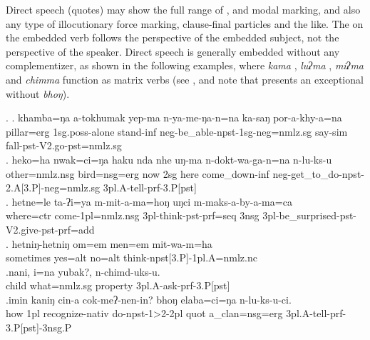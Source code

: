 Direct speech (quotes) may show the full range of ,  and modal marking, and also any type of illocutionary force marking, clause-final  particles and the like. The  on the embedded verb follows the perspective of the embedded subject, not the perspective of the speaker. Direct speech is generally embedded without any complementizer, as shown in the following examples, where \emph{kama} , \emph{luʔma} ,  \emph{miʔma}  and \emph{chimma}  function as matrix verbs (see \Next, and note that  \Next[e] presents an exceptional  without \emph{bhoŋ}).

\ex. \ag. khamba=ŋa a-tokhumak yep-ma n-ya-me-ŋa-n=na ka-saŋ por-a-khy-a=na\\
pillar{\sc =erg} {\sc 1sg.poss}-alone stand{\sc -inf} {\sc neg-}be\_able{\sc -npst-1sg-neg=nmlz.sg} say{\sc -sim} fall{\sc [3sg]-pst-V2.go-pst=nmlz.sg}\\
 
\bg. heko=ha nwak=ci=ŋa haku nda nhe uŋ-ma n-dokt-wa-ga-n=na n-lu-ks-u\\
	other{\sc =nmlz.nsg} bird{\sc =nsg=erg}	now {\sc 2sg} here come\_down{\sc -inf} {\sc neg-}get\_to\_do{\sc -npst-2.A[3.P]-neg=nmlz.sg} 	{\sc 3pl.A}-tell-{\sc prf-3.P[pst]}\\
	 
	\bg. hetne=le ta-ʔi=ya m-mit-a-ma=hoŋ uŋci m-maks-a-by-a-ma=ca\\
	where{\sc =ctr} come{\sc -1pl=nmlz.nsg} {\sc 3pl-}think{\sc -pst-prf=seq} {\sc 3nsg} {\sc 3pl}-be\_surprised-{\sc pst-V2.give-pst-prf=add}\\
	 
\bg. hetniŋ-hetniŋ om=em men=em mit-wa-m=ha\\
sometimes yes{\sc =alt} no{\sc =alt} think{\sc -npst[3.P]-1pl.A=nmlz.nc}\\
\bg.nani,  i=na           yubak?, n-chimd-uks-u.\\
child what{\sc =nmlz.sg} property {\sc 3pl.A-}ask{\sc -prf-3.P[pst]}\\
 
\bg.imin kaniŋ cin-a             cok-meʔ-nen-in?             bhoŋ elaba=ci=ŋa               n-lu-ks-u-ci.\\
how {\sc 1pl} recognize{\sc -nativ} do{\sc -npst-1>2-2pl} {\sc quot} a\_clan{\sc =nsg=erg} {\sc 3pl.A-}tell{\sc -prf-3.P[pst]-3nsg.P}\\
 


